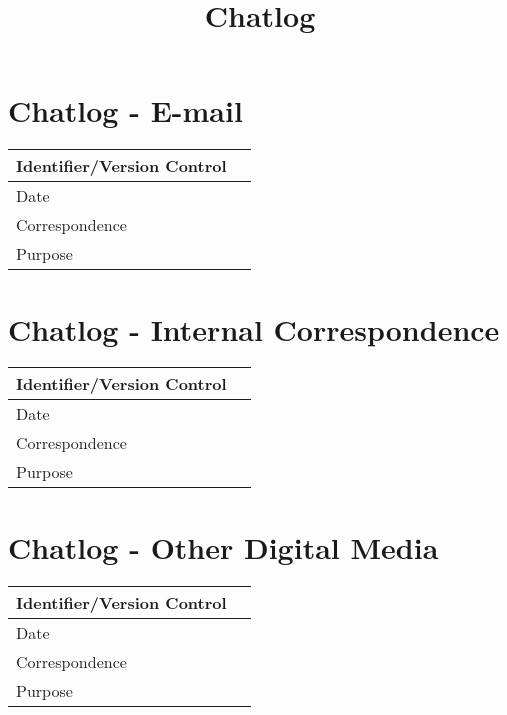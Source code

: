 \documentclass{article}
\title{Chatlog}
\date{}
\begin{document}
    
\section{Chatlog - E-mail}

\begin{center}
    \begin{tabular}{ | p{7cm} | p{7cm} |}
    \hline
    Identifier/Version Control  & \\ \hline
    Date                        & \\ \hline
    Correspondence              & \\ \hline
    Purpose                     & \\ \hline
    \end{tabular}
\end{center}

\newpage

\section{Chatlog - Internal Correspondence}


\begin{center}
    \begin{tabular}{ | p{7cm} | p{7cm} |}
    \hline
    Identifier/Version Control  & \\ \hline
    Date                        & \\ \hline
    Correspondence              & \\ \hline
    Purpose                     & \\ \hline
    \end{tabular}
\end{center}

\newpage


\section{Chatlog - Other Digital Media}

\begin{center}
    \begin{tabular}{ | p{7cm} | p{7cm} |}
    \hline
    Identifier/Version Control  & \\ \hline
    Date                        & \\ \hline
    Correspondence              & \\ \hline
    Purpose                     & \\ \hline
    \end{tabular}
\end{center}
\end{document}
